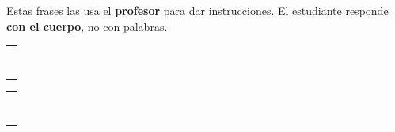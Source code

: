 \documentclass[12pt,a4paper]{article}
\begin{document}
\begin{cajachunk}
Estas frases las usa el \textbf{profesor} para dar instrucciones. El estudiante responde \textbf{con el cuerpo}, no con palabras.

\medskip
\begin{multicols}{2}
\begin{tabularx}{\linewidth}{@{} X @{}}
\eng{Stand up.} \esp{Levántate.} \\
\eng{Sit down.} \esp{Siéntate.} \\
\eng{Turn around.} \esp{Date la vuelta.} \\
\eng{Jump!} \esp{¡Salta!} \\
\eng{Walk to the door.} \esp{Camina a la puerta.} \\
\eng{Run!} \esp{¡Corre!} \\
\eng{Stop!} \esp{¡Para!} \\
\eng{Clap your hands.} \esp{Aplaude.} \\
\end{tabularx}

\columnbreak

\begin{tabularx}{\linewidth}{@{} X @{}}
\eng{Point to \underline{\hspace{1.5cm}}.} \esp{Señala \underline{\hspace{1.5cm}}.} \\
\eng{Touch your nose.} \esp{Toca tu nariz.} \\
\eng{Open the book.} \esp{Abre el libro.} \\
\eng{Close the door.} \esp{Cierra la puerta.} \\
\eng{Pick up the pen.} \esp{Recoge el bolígrafo.} \\
\eng{Put it down.} \esp{Ponlo abajo.} \\
\eng{Look at me.} \esp{Mírame.} \\
\eng{Listen!} \esp{¡Escucha!} \\
\end{tabularx}
\end{multicols}
\end{cajachunk}
\end{document}
